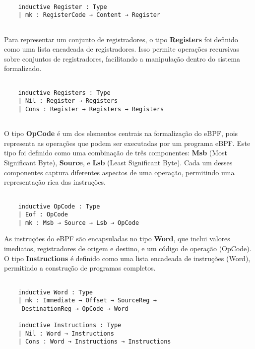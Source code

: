 \documentclass[sigconf]{acmart}
\begin{document}
\begin{center}
\begin{verbatim}   

    inductive Register : Type
    | mk : RegisterCode → Content → Register
    
\end{verbatim}
\end{center}

Para representar um conjunto de registradores, o tipo \textbf{Registers} foi definido como uma lista encadeada de registradores. Isso permite operações recursivas sobre conjuntos de registradores, facilitando a manipulação dentro do sistema formalizado.

\begin{center}
\begin{verbatim}

    inductive Registers : Type
    | Nil : Register → Registers
    | Cons : Register → Registers → Registers
    
\end{verbatim}
\end{center}

O tipo \textbf{OpCode} é um dos elementos centrais na formalização do eBPF, pois representa as operações que podem ser executadas por um programa eBPF. Este tipo foi definido como uma combinação de três componentes: \textbf{Msb} (Most Significant Byte), \textbf{Source}, e \textbf{Lsb} (Least Significant Byte). Cada um desses componentes captura diferentes aspectos de uma operação, permitindo uma representação rica das instruções.

\begin{center}
\begin{verbatim}
    
    inductive OpCode : Type
    | Eof : OpCode
    | mk : Msb → Source → Lsb → OpCode

\end{verbatim}
\end{center}

As instruções do eBPF são encapsuladas no tipo \textbf{Word}, que inclui valores imediatos, registradores de origem e destino, e um código de operação (OpCode). O tipo \textbf{Instructions} é definido como uma lista encadeada de instruções (Word), permitindo a construção de programas completos.

\begin{center}
\begin{verbatim}
    
    inductive Word : Type
    | mk : Immediate → Offset → SourceReg →
     DestinationReg → OpCode → Word
     
    inductive Instructions : Type
    | Nil : Word → Instructions
    | Cons : Word → Instructions → Instructions

\end{verbatim}
\end{center}
\end{document}
